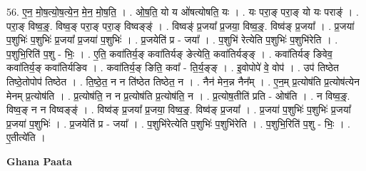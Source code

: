 \documentclass[17pt]{extarticle}
\begin{document}
56. ए॒न॒ मो॒ष॒त्यो॒ष॒त्ये॒न॒ मे॒न॒ मो॒ष॒ति॒ । . ओ॒ष॒ति॒ यो य ओ॑षत्योषति॒ यः । . यः परा॒ङ् परा॒ङ् यो यः पराङ्॑ । . परा॒ङ् विष्व॒ङ्॒. विष्व॒ङ् परा॒ङ् परा॒ङ् विष्वङ्ङ्॑ । . विष्वङ्॑ प्र॒जया᳚ प्र॒जया॒ विष्व॒ङ्॒. विष्व॑ङ् प्र॒जया᳚ । . प्र॒जया॑ प॒शुभिः॑ प॒शुभिः॑ प्र॒जया᳚ प्र॒जया॑ प॒शुभिः॑ । . प्र॒जयेति॑ प्र - जया᳚ । . प॒शुभि॑ रेत्येति प॒शुभिः॑ प॒शुभि॑रेति । . प॒शुभि॒रिति॑ प॒शु - भिः॒ । . ए॒ति॒ कवा॑तिर्य॒ङ् कवा॑तिर्यङ् ङेत्येति॒ कवा॑तिर्यङ्ङ् । . कवा॑तिर्यङ् ङिवेव॒ कवा॑तिर्य॒ङ् कवा॑तिर्यङिव । . कवा॑तिर्य॒ङ् ङिति॒ कवा᳚ - ति॒र्य॒ङ्ङ् । . इ॒वोपोपे॑ वे॒ वोप॑ । . उप॑ तिष्ठेत तिष्ठे॒तोपोप॑ तिष्ठेत । . ति॒ष्ठे॒त॒ न न ति॑ष्ठेत तिष्ठेत॒ न । . नैन॑ मेन॒न्न नैन᳚म् । . ए॒न॒म् प्र॒त्योष॑ति प्र॒त्योष॑त्येन मेनम् प्र॒त्योष॑ति । . प्र॒त्योष॑ति॒ न न प्र॒त्योष॑ति प्र॒त्योष॑ति॒ न । . प्र॒त्योष॒तीति॑ प्रति - ओष॑ति । . न विष्व॒ङ्॒. विष्व॒ङ् न न विष्वङ्ङ्॑ । . विष्व॑ङ् प्र॒जया᳚ प्र॒जया॒ विष्व॒ङ्॒. विष्व॑ङ् प्र॒जया᳚ । . प्र॒जया॑ प॒शुभिः॑ प॒शुभिः॑ प्र॒जया᳚ प्र॒जया॑ प॒शुभिः॑ । . प्र॒जयेति॑ प्र - जया᳚ । . प॒शुभि॑रेत्येति प॒शुभिः॑ प॒शुभि॑रेति । . प॒शुभि॒रिति॑ प॒शु - भिः॒ । . ए॒तीत्ये॑ति । \newline

\textbf{Ghana Paata } \newline
\end{document}

